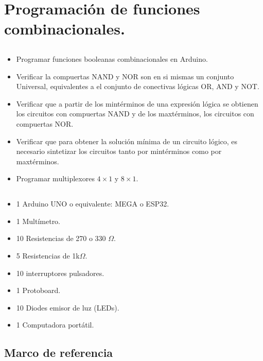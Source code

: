 \chapter{Programación de funciones combinacionales.}

\section{\obj}
\capacidad
\begin{itemize}
    \item  Programar funciones booleanas combinacionales en Arduino.
    \item  Verificar la compuertas NAND y NOR son en si mismas un conjunto Universal, equivalentes a el conjunto de conectivas lógicas OR, AND y NOT.
    \item Verificar que a partir de los mintérminos de una expresión lógica se obtienen los circuitos con compuertas NAND y de los maxtérminos, los circuitos con compuertas NOR.
    \item Verificar que para obtener la solución mínima de un circuito lógico, es necesario sintetizar los circuitos tanto por mintérminos como por maxtérminos. 
    \item Programar multiplexores $4\times1$ y $8\times1$.
\end{itemize} 


\section{\mat}
\begin{itemize}
    \item 1 Arduino UNO o equivalente: MEGA o ESP32.
    \item 1 Multímetro.
    \item 10 Resistencias de 270 o 330 $\Omega$.
    \item 5 Resistencias de 1k$\Omega$.
    \item 10 interruptores pulsadores.
    \item 1 Protoboard.
    \item 10 Diodes emisor de luz (LEDs).
    \item 1 Computadora portátil.
\end{itemize} 

\section{Marco de referencia}

